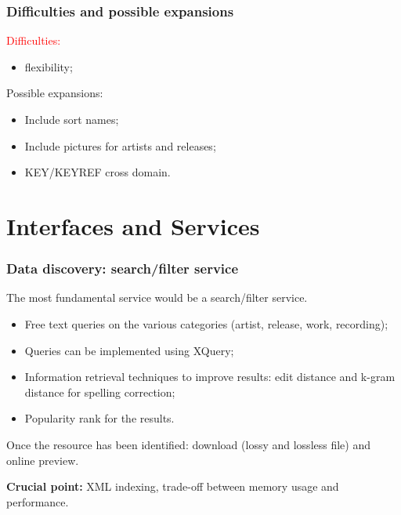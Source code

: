 \documentclass{beamer}
\newcommand\rb[1]{\textcolor{ThemeRed}{\textbf{#1}}}
\begin{document}
  \begin{frame}
    \frametitle{Difficulties and possible expansions}
    
    \textcolor{red}{Difficulties:}
    
    \vspace{0.5em}
    
    \begin{itemize}
      \item flexibility;
      
    \end{itemize}

    \vspace{1em}
    
    Possible expansions:
    
    \vspace{0.5em}
    
    \begin{itemize}
      \item Include sort names;
      \item Include pictures for artists and releases;
      \item KEY/KEYREF cross domain.
    \end{itemize}

  \end{frame}



\section{Interfaces and Services}

  \begin{frame}
    \frametitle{Data discovery: search/filter service}

    The most fundamental service would be a search/filter service.

    \vspace{0.5em}

    \begin{itemize}
      \item Free text queries on the various categories (artist, release, work, recording);
      \item Queries can be implemented using XQuery;
      \item Information retrieval techniques to improve results: edit distance and k-gram distance for spelling correction;
      \item Popularity rank for the results.
    \end{itemize}


    \vspace{1em}

    Once the resource has been identified: download (lossy and lossless file) and online preview.

    \vspace{1em}

    \rb{Crucial point:} XML indexing, trade-off between memory usage and performance.

  \end{frame}
\end{document}
